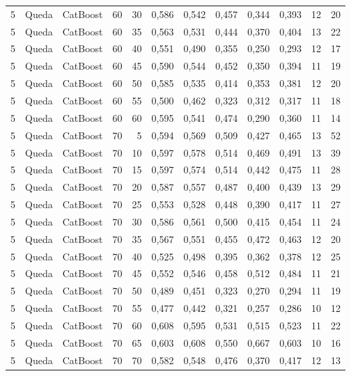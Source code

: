 \begin{longtable}{@{}rllrrrrrrrrr@{}}
5 & Queda & CatBoost & 60 & 30 & 0,586 & 0,542 & 0,457 & 0,344 & 0,393 & 12 & 20 \\
5 & Queda & CatBoost & 60 & 35 & 0,563 & 0,531 & 0,444 & 0,370 & 0,404 & 13 & 22 \\
5 & Queda & CatBoost & 60 & 40 & 0,551 & 0,490 & 0,355 & 0,250 & 0,293 & 12 & 17 \\
5 & Queda & CatBoost & 60 & 45 & 0,590 & 0,544 & 0,452 & 0,350 & 0,394 & 11 & 19 \\
5 & Queda & CatBoost & 60 & 50 & 0,585 & 0,535 & 0,414 & 0,353 & 0,381 & 12 & 20 \\
5 & Queda & CatBoost & 60 & 55 & 0,500 & 0,462 & 0,323 & 0,312 & 0,317 & 11 & 18 \\
5 & Queda & CatBoost & 60 & 60 & 0,595 & 0,541 & 0,474 & 0,290 & 0,360 & 11 & 14 \\
5 & Queda & CatBoost & 70 & 5 & 0,594 & 0,569 & 0,509 & 0,427 & 0,465 & 13 & 52 \\
5 & Queda & CatBoost & 70 & 10 & 0,597 & 0,578 & 0,514 & 0,469 & 0,491 & 13 & 39 \\
5 & Queda & CatBoost & 70 & 15 & 0,597 & 0,574 & 0,514 & 0,442 & 0,475 & 11 & 28 \\
5 & Queda & CatBoost & 70 & 20 & 0,587 & 0,557 & 0,487 & 0,400 & 0,439 & 13 & 29 \\
5 & Queda & CatBoost & 70 & 25 & 0,553 & 0,528 & 0,448 & 0,390 & 0,417 & 11 & 27 \\
5 & Queda & CatBoost & 70 & 30 & 0,586 & 0,561 & 0,500 & 0,415 & 0,454 & 11 & 24 \\
5 & Queda & CatBoost & 70 & 35 & 0,567 & 0,551 & 0,455 & 0,472 & 0,463 & 12 & 20 \\
5 & Queda & CatBoost & 70 & 40 & 0,525 & 0,498 & 0,395 & 0,362 & 0,378 & 12 & 25 \\
5 & Queda & CatBoost & 70 & 45 & 0,552 & 0,546 & 0,458 & 0,512 & 0,484 & 11 & 21 \\
5 & Queda & CatBoost & 70 & 50 & 0,489 & 0,451 & 0,323 & 0,270 & 0,294 & 11 & 19 \\
5 & Queda & CatBoost & 70 & 55 & 0,477 & 0,442 & 0,321 & 0,257 & 0,286 & 10 & 12 \\
5 & Queda & CatBoost & 70 & 60 & 0,608 & 0,595 & 0,531 & 0,515 & 0,523 & 11 & 22 \\
5 & Queda & CatBoost & 70 & 65 & 0,603 & 0,608 & 0,550 & 0,667 & 0,603 & 10 & 16 \\
5 & Queda & CatBoost & 70 & 70 & 0,582 & 0,548 & 0,476 & 0,370 & 0,417 & 12 & 13 \\

\end{longtable}
